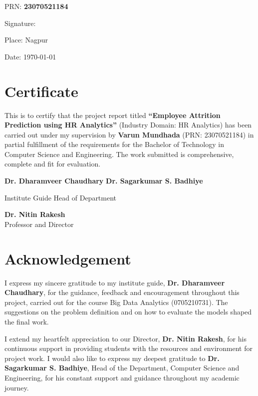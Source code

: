 \documentclass[12pt,a4paper]{report}
\newcommand{\projtitle}{Employee Attrition Prediction using HR Analytics}
\begin{document}
PRN: \textbf{23070521184}

Signature:
\vspace{2cm}

Place: Nagpur

Date: \today


\chapter*{Certificate}
\thispagestyle{frontpages}

This is to certify that the project report titled \textbf{``\projtitle''} (Industry Domain: HR Analytics) has been carried out under my supervision by \textbf{Varun Mundhada} (PRN: 23070521184) in partial fulfillment of the requirements for the Bachelor of Technology in Computer Science and Engineering. The work submitted is comprehensive, complete and fit for evaluation.
\vspace{2.5cm}

\textbf{Dr. Dharamveer Chaudhary} \hfill \textbf{Dr. Sagarkumar S. Badhiye}

Institute Guide \hfill Head of Department

\vspace{2.5cm}

\begin{center}
\textbf{Dr. Nitin Rakesh}\\
Professor and Director
\end{center}


\chapter*{Acknowledgement}
\thispagestyle{frontpages}

I express my sincere gratitude to my institute guide, \textbf{Dr. Dharamveer Chaudhary}, for the guidance, feedback and encouragement throughout this project, carried out for the course Big Data Analytics (0705210731). The suggestions on the problem definition and on how to evaluate the models shaped the final work.

I extend my heartfelt appreciation to our Director, \textbf{Dr. Nitin Rakesh}, for his continuous support in providing students with the resources and environment for project work. I would also like to express my deepest gratitude to \textbf{Dr. Sagarkumar S. Badhiye}, Head of the Department, Computer Science and Engineering, for his constant support and guidance throughout my academic journey.
\end{document}
